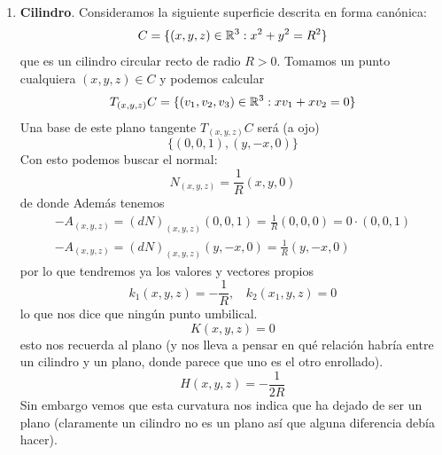 \begin{ejemplo}
\begin{enumerate}
            \item \textbf{Cilindro}. Consideramos la siguiente superficie descrita en forma canónica:
            \begin{equation*}
                C = \{(x,y,z)\in \mathbb{R}^3 : x^2 + y^2 = R^2\}
            \end{equation*}
            que es un cilindro circular recto de radio $R>0$. Tomamos un punto cualquiera $(x,y,z)\in C$ y podemos calcular
            \begin{equation*}
                T_{(x,y,z)}C = \{(v_1, v_2, v_3)\in \mathbb{R}^3: xv_1 + xv_2 = 0\}
            \end{equation*}
            Una base de este plano tangente $T_{(x,y,z)}C$ será (a ojo)
            \begin{equation*}
                \{(0,0,1), (y,-x,0)\}
            \end{equation*}
            Con esto podemos buscar el normal:
            \begin{equation*}
                N_{(x,y,z)} = \frac{1}{R}(x,y,0)
            \end{equation*}
            de donde 
            Además tenemos 
            \begin{gather*}
                -A_{(x,y,z)} = (dN)_{(x,y,z)}(0,0,1) = \frac{1}{R}(0,0,0) = 0 \cdot (0,0,1)\\
                -A_{(x,y,z)} = (dN)_{(x,y,z)}(y, -x, 0) = \frac{1}{R}(y, -x, 0)
            \end{gather*}
            por lo que tendremos ya los valores y vectores propios
            \begin{equation*}
                k_1(x,y,z) = -\frac{1}{R},\ \ \ \ k_2(x_1, y, z)=0
            \end{equation*}
            lo que nos dice que ningún punto umbilical.
            \begin{equation*}
                K(x,y,z) = 0
            \end{equation*}
            esto nos recuerda al plano (y nos lleva a pensar en qué relación habría entre un cilindro y un plano, donde parece que uno es el otro enrollado).
            \begin{equation*}
                H(x,y,z) = - \frac{1}{2R}
            \end{equation*}
            Sin embargo vemos que esta curvatura nos indica que ha dejado de ser un plano (claramente un cilindro no es un plano así que alguna diferencia debía hacer).
    \end{enumerate}
\end{ejemplo}

